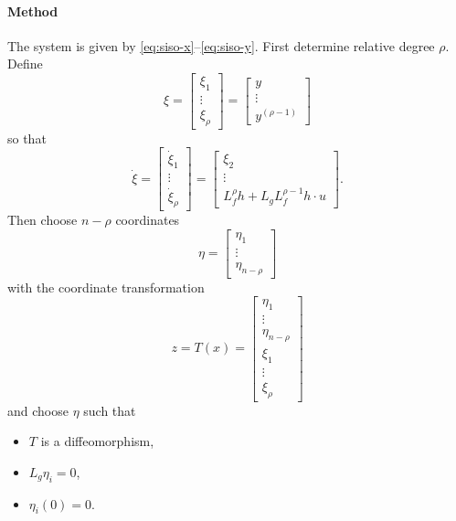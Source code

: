 \paragraph{Method}
The system is given by \eqref{eq:siso-x}--\eqref{eq:siso-y}. First determine relative degree $\rho$. Define
\begin{equation}
	\xi =
	\begin{bmatrix}
		\xi_1 \\ \vdots \\ \xi_\rho
	\end{bmatrix}
	=
	\begin{bmatrix}
		y \\ \vdots \\ y^{(\rho-1)}
	\end{bmatrix}
\end{equation}
so that
\begin{equation}
	\dot{\xi} =
	\begin{bmatrix}
		\dot{\xi}_1 \\ \vdots \\ \dot{\xi}_\rho
	\end{bmatrix}
	=
	\begin{bmatrix}
		\xi_2 \\ \vdots \\ L_f^\rho h + L_g L_f^{\rho-1} h \cdot u
	\end{bmatrix}
	.
\end{equation}
Then choose $n-\rho$ coordinates
\begin{equation}
	\eta =
	\begin{bmatrix}
		\eta_1 \\ \vdots \\ \eta_{n-\rho}
	\end{bmatrix}
\end{equation}
with the coordinate transformation
\begin{equation}
	z = T(x) =
	\begin{bmatrix}
		\eta_1 \\ \vdots \\ \eta_{n-\rho} \\ \xi_1 \\ \vdots \\ \xi_\rho
	\end{bmatrix}
\end{equation}
and choose $\eta$ such that
\begin{itemize}
	\item $T$ is a diffeomorphism,
	\item $L_g \eta_i = 0$,
	\item $\eta_i(0) = 0$.
\end{itemize}
